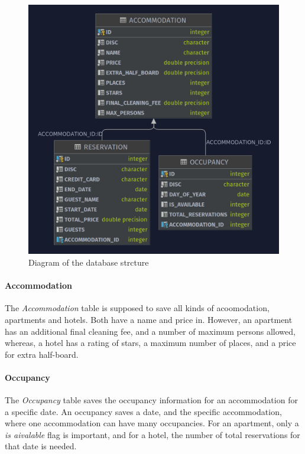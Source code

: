 \begin{figure}[h]
\centering
\includegraphics[scale=0.3]{images/02_design/design-database}
\caption{Diagram of the database strcture}
\label{fig:02_design_db_structure_diagram}
\end{figure}

\paragraph{Accommodation}
The \textit{Accommodation} table is supposed to save all kinds of acoomodation, apartments and hotels. Both have a name and price in. However, an apartment has an additional final cleaning fee, and a number of maximum persons allowed, whereas, a hotel has a rating of stars, a maximum number of places, and a price for extra half-board.

\paragraph{Occupancy}
The \textit{Occupancy} table saves the occupancy information for an accommodation for a specific date. An occupancy saves a date, and the specific accommodation, where one accommodation can have many occupancies. For an apartment, only a \textit{is aivalable} flag is important, and for a hotel, the number of total reservations for that date is needed.


